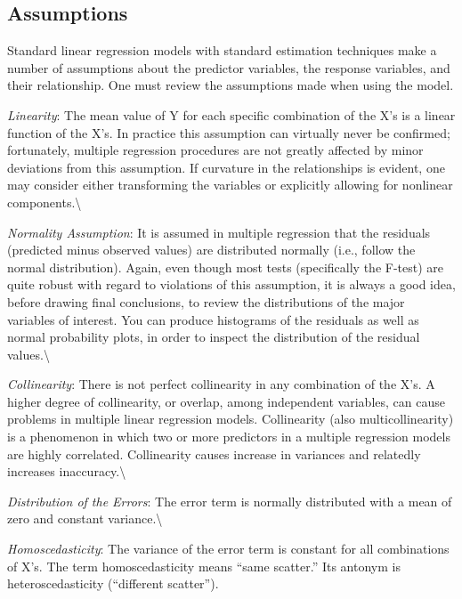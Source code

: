 \documentclass[10pt,b5paper,]{book}
\theoremstyle{definition}
\theoremstyle{definition}
\theoremstyle{definition}
\theoremstyle{remark}
\begin{document}
\hypertarget{assumptions}{%
\subsection{Assumptions}\label{assumptions}}

Standard linear regression models with standard estimation techniques
make a number of assumptions 
about the predictor variables, the response variables, and their
relationship. One must review the assumptions made when using the model.

\emph{Linearity}: The mean value of Y for each specific combination of
the X's is a linear function of the X's. In practice this assumption can
virtually never be confirmed; fortunately, multiple regression
procedures are not greatly affected by minor deviations from this
assumption. If curvature in the relationships is evident, one may
consider either transforming the variables or explicitly allowing for
nonlinear components.\textbackslash{}

\emph{Normality Assumption}: It is assumed in multiple regression that
the residuals (predicted minus observed values) are distributed normally
(i.e., follow the normal distribution). Again, even though most tests
(specifically the F-test) are quite robust with regard to violations of
this assumption, it is always a good idea, before drawing final
conclusions, to review the distributions of the major variables of
interest. You can produce histograms of the residuals as well as normal
probability plots, in order to inspect the distribution of the residual
values.\textbackslash{}

\emph{Collinearity}: There is not perfect collinearity in any
combination of the X's. A higher degree of collinearity, or overlap,
among independent variables, can cause problems in multiple linear
regression models. Collinearity (also multicollinearity) is a phenomenon
in which two or more predictors in a multiple regression models are
highly correlated. Collinearity causes increase in variances and
relatedly increases inaccuracy.\textbackslash{}

\emph{Distribution of the Errors}: The error term is normally
distributed with a mean of zero and constant variance.\textbackslash{}

\emph{Homoscedasticity}: The variance of the error term is constant for
all combinations of X's. The term homoscedasticity means ``same
scatter.'' Its antonym is heteroscedasticity (``different scatter'').
\end{document}
